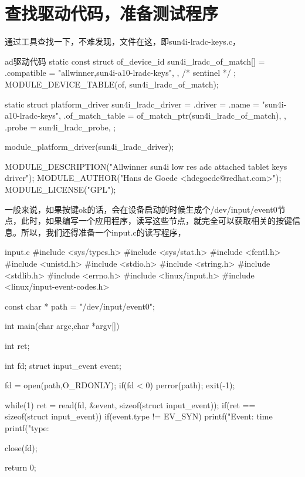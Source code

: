 \documentclass[lang=cn,newtx,10pt,scheme=chinese]{elegantbook}
\begin{document}
\section{查找驱动代码，准备测试程序}

通过工具查找一下，不难发现，文件在这，即sun4i-lradc-keys.c，

\begin{mycode}{ad驱动代码}
static const struct of_device_id sun4i_lradc_of_match[] = {
    { .compatible = "allwinner,sun4i-a10-lradc-keys", },
    { /* sentinel */ }
};
MODULE_DEVICE_TABLE(of, sun4i_lradc_of_match);

static struct platform_driver sun4i_lradc_driver = {
    .driver = {
        .name    = "sun4i-a10-lradc-keys",
        .of_match_table = of_match_ptr(sun4i_lradc_of_match),
    },
    .probe    = sun4i_lradc_probe,
};

module_platform_driver(sun4i_lradc_driver);

MODULE_DESCRIPTION("Allwinner sun4i low res adc attached tablet keys driver");
MODULE_AUTHOR("Hans de Goede <hdegoede@redhat.com>");
MODULE_LICENSE("GPL");    
\end{mycode}

一般来说，如果按键ok的话，会在设备启动的时候生成个/dev/input/event0节点，此时，如果编写一个应用程序，读写这些节点，就完全可以获取相关的按键信息。所以，我们还得准备一个input.c的读写程序，

\begin{mycode}{input.c}
#include <sys/types.h>
#include <sys/stat.h>
#include <fcntl.h>
#include <unistd.h>
#include <stdio.h>
#include <string.h>
#include <stdlib.h>
#include <errno.h>
#include <linux/input.h>
#include <linux/input-event-codes.h>

const char * path = "/dev/input/event0";

int main(char argc,char *argv[])
{
    int ret;

    int fd;
    struct input_event event;

    fd = open(path,O_RDONLY);
    if(fd < 0)
    {
        perror(path);
        exit(-1);
    }

    while(1)
    {
        ret = read(fd, &event, sizeof(struct input_event));
        if(ret == sizeof(struct input_event))
        {
            if(event.type != EV_SYN)
            {
                printf("Event: time %
                printf("type:%
            }
        }
    }
 
    close(fd);

    return 0;
}
\end{mycode}
\end{document}
